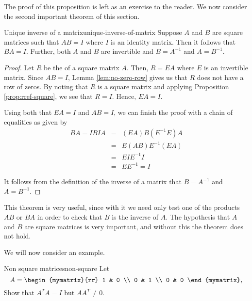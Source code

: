 The proof of this proposition is left as an exercise to the reader. 
We now consider the second important theorem of this section. 

\begin{theorem}{Unique inverse of a matrix}{unique-inverse-of-matrix}
Suppose $A$ and $B$ are square matrices such that $AB=I$ where $I$ is an identity matrix. Then it follows that $BA=I$. Further, both $A$ and $B$ are invertible and $B=A^{-1}$ and $A=B^{-1}$.
\end{theorem}

\begin{proof}
Let $R$ be the {\rref} of a square matrix $A$. Then, $R=EA$ where $E$ is an invertible matrix. Since $AB=I$, Lemma \ref{lem:no-zero-row} gives us that $R$ does not have a row of zeros. By noting that $R$ is a square matrix and applying Proposition \ref{prop:rref-square}, we see that $R=I$. Hence, $EA=I$. 

Using both that $EA=I$ and $AB=I$, we can finish the proof with a chain of equalities as given by
\begin{eqnarray*}
BA = IBIA &=& (EA)B(E^{-1}E)A \\
&=& E(AB)E^{-1}(EA) \\
&=& EIE^{-1}I \\
&=& EE^{-1} = I
\end{eqnarray*}

It follows from the definition of the inverse of a matrix that $B=A^{-1}$ and $A=B^{-1}$.
\end{proof}

This theorem is very useful, since with it we need only test one of the products $AB$ or $BA$ in order to check that $B$ is the inverse of $A$. The hypothesis that $A$ and $B$ are square matrices is very important, and without this the theorem does not hold.

We will now consider an example.

\begin{example}{Non square matrices}{non-square}
Let 
\begin{equation*}
A =
\begin{mymatrix}{rr}
1 & 0 \\
0 & 1 \\
0 & 0 
\end{mymatrix},
\end{equation*}
Show that $A^{T}A = I$ but $AA^{T} \neq 0$. 
\end{example}

